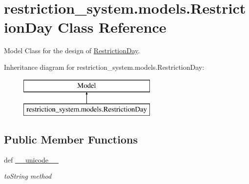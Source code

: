 \hypertarget{classrestriction__system_1_1models_1_1RestrictionDay}{}\section{restriction\+\_\+system.\+models.\+Restriction\+Day Class Reference}
\label{classrestriction__system_1_1models_1_1RestrictionDay}


Model Class for the design of \hyperlink{classrestriction__system_1_1models_1_1RestrictionDay}{Restriction\+Day}.  


Inheritance diagram for restriction\+\_\+system.\+models.\+Restriction\+Day\+:\begin{figure}[H]
\begin{center}
\leavevmode
\includegraphics[height=2.000000cm]{classrestriction__system_1_1models_1_1RestrictionDay}
\end{center}
\end{figure}
\subsection*{Public Member Functions}
\begin{DoxyCompactItemize}
\item 
def \hyperlink{classrestriction__system_1_1models_1_1RestrictionDay_a3829ecbf2b6277b45151407d232297fc}{\+\_\+\+\_\+unicode\+\_\+\+\_\+}
\begin{DoxyCompactList}\small\item\em to\+String method \end{DoxyCompactList}\end{DoxyCompactItemize}
